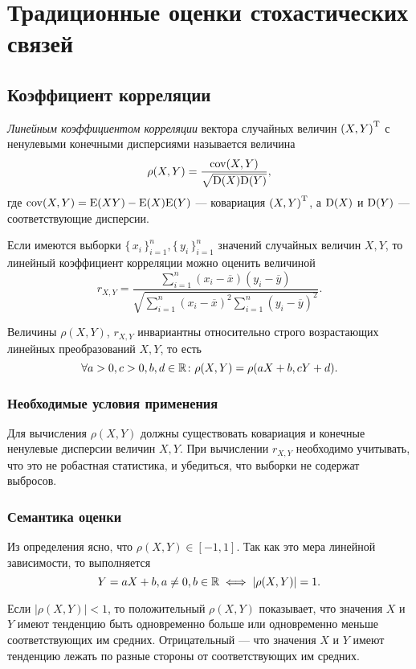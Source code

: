 \section*{Традиционные оценки стохастических связей}
\subsection*{Коэффициент корреляции}

\begin{define}
\emph{Линейным коэффициентом корреляции} вектора случайных величин ${(X, Y)}^\mathrm{T}$ с ненулевыми конечными дисперсиями называется величина
\begin{equation}
	\rho(X, Y) = \frac{\mathrm{cov}(X, Y)}{\sqrt{\mathrm{D}(X)\mathrm{D}(Y)}},
\end{equation}
где $\mathrm{cov}(X, Y) = \mathrm{E}(XY) - \mathrm{E}(X)\mathrm{E}(Y)$ --- ковариация ${(X, Y)}^\mathrm{T}$, а $\mathrm{D}(X)$ и $\mathrm{D}(Y)$ --- соответствующие дисперсии.
\end{define}

Если имеются выборки $\{\, x_i \,\}_{i=1}^n, \{\, y_i \,\}_{i=1}^n$ значений случайных величин $X, Y$, то линейный коэффициент корреляции можно оценить величиной
\begin{equation}
r_{X, Y} = \frac{\sum_{i=1}^{n} (x_i - \overline{x})(y_i - \overline{y})}{\sqrt{\sum_{i=1}^{n} (x_i - \overline{x})^2 \sum_{i=1}^{n} (y_i - \overline{y})^2}}.
\end{equation}

Величины $\rho(X, Y)$, $r_{X, Y}$ инвариантны относительно строго возрастающих линейных преобразований $X, Y$, то есть
\[
\forall a > 0, c > 0, b, d \in \mathbb{R} \colon \rho(X, Y) = \rho(aX + b, cY + d).
\]

\subsubsection*{Необходимые условия применения}
Для вычисления $\rho(X, Y)$ должны существовать ковариация и конечные ненулевые дисперсии величин $X, Y$. При вычислении $r_{X, Y}$ необходимо учитывать, что это не робастная статистика, и убедиться, что выборки не содержат выбросов.
\subsubsection*{Семантика оценки}
Из определения ясно, что $\rho(X, Y) \in [-1, 1]$. Так как это мера линейной зависимости, то выполняется
\[
Y = aX + b, a \neq 0, b \in \mathbb{R} \iff |\rho(X, Y)| = 1.
\]

Если $|\rho(X, Y)| < 1$, то положительный $\rho(X, Y)$ показывает, что значения $X$ и $Y$ имеют тенденцию быть одновременно больше или одновременно меньше соответствующих им средних. Отрицательный --- что значения $X$ и $Y$ имеют тенденцию лежать по разные стороны от соответствующих им средних.

